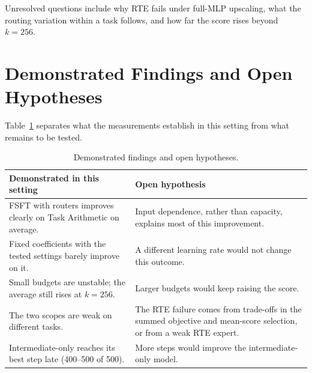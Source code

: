 Unresolved questions include why RTE fails under full-MLP upscaling, what the routing variation within a task follows, and how far the score rises beyond $k=256$.

\section{Demonstrated Findings and Open Hypotheses}

Table~\ref{tab:findings} separates what the measurements establish in this setting from what remains to be tested.

\begin{table}[htbp]
  \centering\tablestyle
  \caption{Demonstrated findings and open hypotheses.}
  \label{tab:findings}
  \begin{tabularx}{\linewidth}{*{2}{>{\raggedright\arraybackslash}X}}
    \toprule
    Demonstrated in this setting & Open hypothesis\\
    \midrule
    FSFT with routers improves clearly on Task Arithmetic on average. & Input dependence, rather than capacity, explains most of this improvement.\\
    Fixed coefficients with the tested settings barely improve on it. & A different learning rate would not change this outcome.\\
    Small budgets are unstable; the average still rises at $k=256$. & Larger budgets would keep raising the score.\\
    The two scopes are weak on different tasks. & The RTE failure comes from trade-offs in the summed objective and mean-score selection, or from a weak RTE expert.\\
    Intermediate-only reaches its best step late (400--500 of 500). & More steps would improve the intermediate-only model.\\
    \bottomrule
  \end{tabularx}
\end{table}
